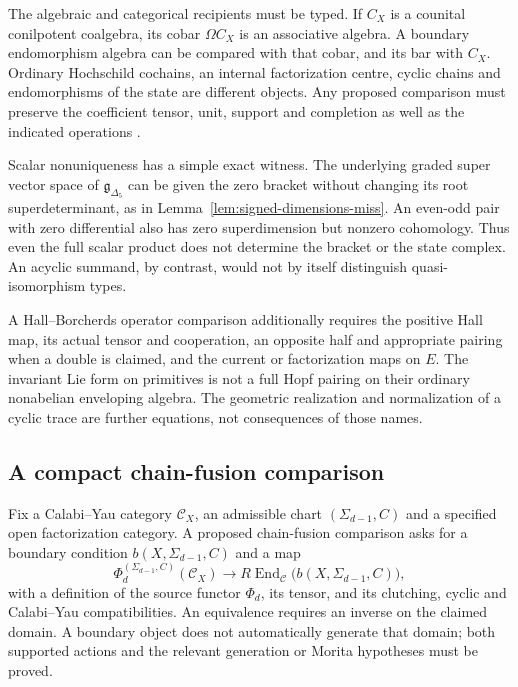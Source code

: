 The algebraic and categorical recipients must be typed. If
\(C_X\) is a counital conilpotent coalgebra, its cobar
\(\Omega C_X\) is an associative algebra. A boundary endomorphism
algebra can be compared with that cobar, and its bar with \(C_X\).
Ordinary Hochschild cochains, an internal factorization centre,
cyclic chains and endomorphisms of the state are different objects.
Any proposed comparison must preserve the coefficient tensor,
unit, support and completion as well as the indicated operations
\cite{ChiralBarCobarVolI,ChiralBarCobarVolII}.

Scalar nonuniqueness has a simple exact witness. The underlying
graded super vector space of \(\mathfrak g_{\Delta_5}\) can be
given the zero bracket without changing its root superdeterminant,
as in Lemma~\ref{lem:signed-dimensions-miss}. An even-odd pair
with zero differential also has zero superdimension but nonzero
cohomology. Thus even the full scalar product does not determine
the bracket or the state complex. An acyclic summand, by contrast,
would not by itself distinguish quasi-isomorphism types.

A Hall--Borcherds operator comparison additionally requires the
positive Hall map, its actual tensor and cooperation, an opposite
half and appropriate pairing when a double is claimed, and the
current or factorization maps on \(E\). The invariant Lie form
on primitives is not a full Hopf pairing on their ordinary
nonabelian enveloping algebra. The geometric realization and
normalization of a cyclic trace are further equations, not
consequences of those names.

\subsection{A compact chain-fusion comparison}
\label{subsubsec:open-chain-fusion}

Fix a Calabi--Yau category \(\mathcal C_X\), an admissible chart
\((\Sigma_{d-1},C)\) and a specified open factorization category.
A proposed chain-fusion comparison asks for a boundary condition
\(b(X,\Sigma_{d-1},C)\) and a map
\[
 \Phi_d^{(\Sigma_{d-1},C)}(\mathcal C_X)
       \longrightarrow
 R\operatorname{End}_{\mathcal C}
       \bigl(b(X,\Sigma_{d-1},C)\bigr),
\]
with a definition of the source functor \(\Phi_d\), its tensor,
and its clutching, cyclic and Calabi--Yau compatibilities.
An equivalence requires an inverse on the claimed domain.
A boundary object does not automatically generate that domain;
both supported actions and the relevant generation or Morita
hypotheses must be proved.

